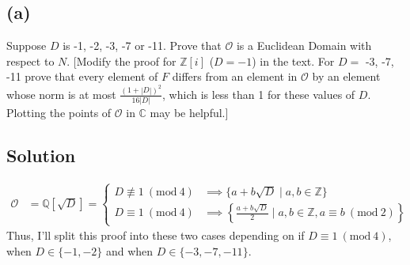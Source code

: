 \documentclass[fleqn]{article}
\newcommand{\Mod}[1]{\ (\mathrm{mod}\ #1)}
\begin{document}
        \subsection{(a)}
        Suppose $D$ is -1, -2, -3, -7 or -11.  Prove that $\mathcal{O}$ is a Euclidean Domain with respect to $N$.  [Modify the proof for $\mathbb{Z}[i]$ ($D = -1$) in the text.  For $D = $ -3, -7, -11 prove that every element of $F$ differs from an element in $\mathcal{O}$ by an element whose norm is at most $\frac{(1 + |D|)^2}{16 |D|}$, which is less than 1 for these values of $D$.  Plotting the points of $\mathcal{O}$ in $\mathbb{C}$ may be helpful.]
        
        \subsection{Solution}
        \begin{align}
            \mathcal{O} &= \mathbb{Q}\left[\sqrt{D}\right] = \begin{cases}
                D \not\equiv 1 \Mod{4} &\implies \{a + b\sqrt{D} \mid a, b \in \mathbb{Z}\} \\
                D \equiv 1 \Mod{4} &\implies \left\{\frac{a + b\sqrt{D}}{2} \mid a, b \in \mathbb{Z}, a \equiv b \Mod{2}\right\}
            \end{cases}
        \end{align}
        Thus, I'll split this proof into these two cases depending on if $D \equiv 1 \Mod{4}$, when $D \in \{-1, -2\}$ and when $D \in \{-3, -7, -11\}$.
        
\end{document}
